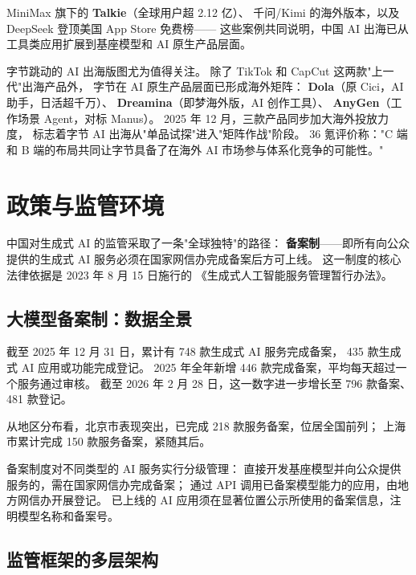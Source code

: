 MiniMax 旗下的 \textbf{Talkie}（全球用户超 2.12 亿）、
千问/Kimi 的海外版本，以及 DeepSeek 登顶美国 App Store 免费榜——
这些案例共同说明，中国 AI 出海已从工具类应用扩展到基座模型和 AI 原生产品层面。

字节跳动的 AI 出海版图尤为值得关注。
除了 TikTok 和 CapCut 这两款"上一代"出海产品外，
字节在 AI 原生产品层面已形成海外矩阵：
\textbf{Dola}（原 Cici，AI 助手，日活超千万）、
\textbf{Dreamina}（即梦海外版，AI 创作工具）、
\textbf{AnyGen}（工作场景 Agent，对标 Manus）。
2025 年 12 月，三款产品同步加大海外投放力度，
标志着字节 AI 出海从"单品试探"进入"矩阵作战"阶段。
36 氪评价称："C 端和 B 端的布局共同让字节具备了在海外 AI 市场参与体系化竞争的可能性。"


\section{政策与监管环境}
\label{sec:china-policy}

中国对生成式 AI 的监管采取了一条"全球独特"的路径：
\textbf{备案制}——即所有向公众提供的生成式 AI 服务必须在国家网信办完成备案后方可上线。
这一制度的核心法律依据是 2023 年 8 月 15 日施行的
《生成式人工智能服务管理暂行办法》。

\subsection{大模型备案制：数据全景}
\label{subsec:china-filing-system}

截至 2025 年 12 月 31 日，累计有 748 款生成式 AI 服务完成备案，
435 款生成式 AI 应用或功能完成登记。
2025 年全年新增 446 款完成备案，平均每天超过一个服务通过审核。
截至 2026 年 2 月 28 日，这一数字进一步增长至 796 款备案、481 款登记。

从地区分布看，北京市表现突出，已完成 218 款服务备案，位居全国前列；
上海市累计完成 150 款服务备案，紧随其后。

备案制度对不同类型的 AI 服务实行分级管理：
直接开发基座模型并向公众提供服务的，需在国家网信办完成备案；
通过 API 调用已备案模型能力的应用，由地方网信办开展登记。
已上线的 AI 应用须在显著位置公示所使用的备案信息，注明模型名称和备案号。

\subsection{监管框架的多层架构}
\label{subsec:china-reg-framework}


